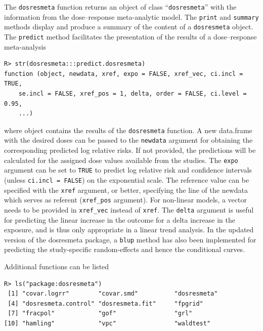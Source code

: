 \documentclass[11pt,a4paper,twoside,openany]{book}\usepackage{knitr}
\newcommand{\pkg}[1]{{\fontseries{b}\selectfont #1}}
\begin{document}
{{The \texttt{dosresmeta} function returns an object of class ``\texttt{dosresmeta}'' with the information from the dose--response meta-analytic model. The \texttt{print} and \texttt{summary} methods display and produce a summary of the content of a \texttt{dosresmeta} object. The \texttt{predict} method facilitates the presentation of the results of a dose--response meta-analysis

\begin{knitrout}\footnotesize
{}\color{fgcolor}\begin{kframe}
\begin{verbatim}
R> str(dosresmeta:::predict.dosresmeta)
function (object, newdata, xref, expo = FALSE, xref_vec, ci.incl = TRUE, 
    se.incl = FALSE, xref_pos = 1, delta, order = FALSE, ci.level = 0.95, 
    ...)  
\end{verbatim}
\end{kframe}
\end{knitrout}

\noindent where object contains the results of the \texttt{dosresmeta} function. A new data.frame with the desired doses can be passed to the \texttt{newdata} argument for obtaining the corresponding predicted log relative risks. If not provided, the predictions will be calculated for the assigned dose values available from the studies. The \texttt{expo} argument can be set to \texttt{TRUE} to predict log relative risk and confidence intervals (unless \texttt{ci.incl = FALSE}) on the exponential scale. The reference value can be specified with the \texttt{xref} argument, or better, specifying the line of the newdata which serves as referent (\texttt{xref\_pos} argument). For non-linear models, a vector needs to be provided in \texttt{xref\_vec} instead of \texttt{xref}. The \texttt{delta} argument is useful for predicting the linear increase in the outcome for a delta increase in the exposure, and is thus only appropriate in a linear trend analysis. In the updated version of the \pkg{dosresmeta} package, a \texttt{blup} method has also been implemented for predicting the study-specific random-effects and hence the conditional curves.

Additional functions can be listed

\begin{knitrout}\footnotesize
{}\color{fgcolor}\begin{kframe}
\begin{verbatim}
R> ls("package:dosresmeta")
 [1] "covar.logrr"        "covar.smd"          "dosresmeta"        
 [4] "dosresmeta.control" "dosresmeta.fit"     "fpgrid"            
 [7] "fracpol"            "gof"                "grl"               
[10] "hamling"            "vpc"                "waldtest"          
\end{verbatim}
\end{kframe}
\end{knitrout}

}}
\end{document}
